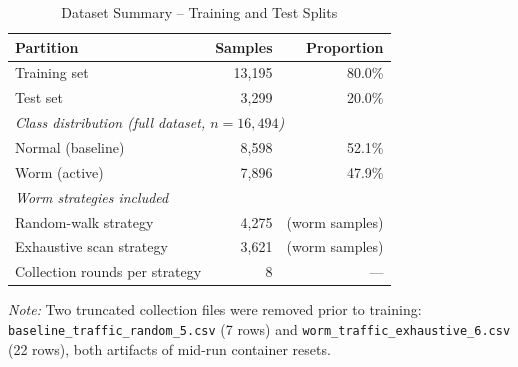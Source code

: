 %


\begin{table}[ht]
\centering
\caption{Dataset Summary -- Training and Test Splits}
\label{tab:dataset_summary}
\begin{tabular}{lrr}
\toprule
\textbf{Partition} & \textbf{Samples} & \textbf{Proportion} \\
\midrule
Training set          & 13{,}195 & 80.0\% \\
Test set              & 3{,}299  & 20.0\% \\
\midrule
\multicolumn{3}{l}{\textit{Class distribution (full dataset, $n = 16{,}494$)}} \\
\midrule
Normal (baseline)     & 8{,}598 & 52.1\% \\
Worm (active)         & 7{,}896 & 47.9\% \\
\midrule
\multicolumn{3}{l}{\textit{Worm strategies included}} \\
\midrule
Random-walk strategy  & 4{,}275 & (worm samples) \\
Exhaustive scan strategy & 3{,}621 & (worm samples) \\
Collection rounds per strategy & 8 & --- \\
\bottomrule
\end{tabular}
\begin{minipage}{\linewidth}
\vspace{4pt}
\small
\textit{Note:} Two truncated collection files were removed prior to training:
\texttt{baseline\_traffic\_random\_5.csv} (7 rows) and
\texttt{worm\_traffic\_exhaustive\_6.csv} (22 rows), both artifacts of mid-run
container resets.
\end{minipage}
\end{table}


